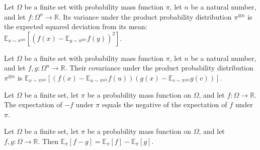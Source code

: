 \begin{definition}
\label{FABL.productVariance}
\leanok
{}
Let $\Omega$ be a finite set with probability mass function $\pi$, let $n$ be a natural
number, and let $f:\Omega^n\to\mathbb R$. Its variance under the product probability
distribution $\pi^{\otimes n}$ is the expected squared deviation from its mean: $\mathbb
E_{x\sim\pi^{\otimes n}}[(f(x)-\mathbb E_{y\sim\pi^{\otimes n}}f(y))^2]$.
\end{definition}

\begin{definition}
\label{FABL.productCovariance}
\leanok
{}
Let $\Omega$ be a finite set with probability mass function $\pi$, let $n$ be a natural
number, and let $f,g:\Omega^n\to\mathbb R$. Their covariance under the product
probability distribution $\pi^{\otimes n}$ is $\mathbb E_{x\sim\pi^{\otimes
n}}[(f(x)-\mathbb E_{u\sim\pi^{\otimes n}}f(u))(g(x)-\mathbb E_{v\sim\pi^{\otimes
n}}g(v))]$.
\end{definition}

\begin{theorem}
\label{FABL.pmfExpectation_neg_general}
\leanok
{}
Let $\Omega$ be a finite set, let $\pi$ be a probability mass function on $\Omega$, and
let $f:\Omega\to\mathbb{R}$. The expectation of $-f$ under $\pi$ equals the negative of
the expectation of $f$ under $\pi$.
\end{theorem}

\begin{theorem}
\label{FABL.pmfExpectation_sub_general}
\leanok
{}
Let $\Omega$ be a finite set, let $\pi$ be a probability mass function on $\Omega$, and
let $f,g:\Omega\to\mathbb{R}$. Then
$\mathbb{E}_{\pi}[f-g]=\mathbb{E}_{\pi}[f]-\mathbb{E}_{\pi}[g]$.
\end{theorem}

